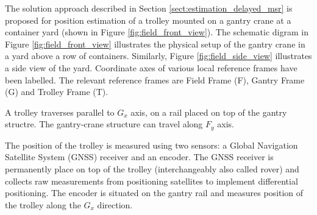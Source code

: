 The solution approach described in Section \ref{sect:estimation_delayed_msr} is proposed for position estimation of a trolley mounted on a gantry crane at a container yard (shown in Figure \ref{fig:field_front_view}). 
The schematic digram in Figure \ref{fig:field_front_view} illustrates the physical setup of the gantry crane in a yard above a row of containers. 
Similarly, Figure \ref{fig:field_side_view} illustrates a side view of the yard.  
Coordinate axes of various local reference frames have been labelled. 
The relevant reference frames are Field Frame (F), Gantry Frame (G) and Trolley Frame (T).

A trolley traverses parallel to $G_x$ axis, on a rail placed on top of the gantry structre. The gantry-crane structure can travel along $F_y$ axis.

The position of the trolley is measured using two sensors: a Global Navigation Satellite System (GNSS) receiver and an encoder. 
The GNSS receiver is permanently place on top of the trolley (interchangeably also called rover) and collects raw measurements from positioning satellites to implement differential positioning.
The encoder is situated on the gantry rail and measures position of the trolley along the $G_x$ direction.
